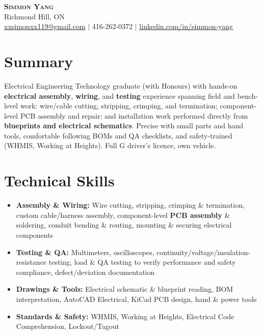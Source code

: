 \documentclass[letterpaper,11pt]{article}
\begin{document}
\begin{center}
    \textbf{\Huge \scshape Simmon Yang} \\ \vspace{1pt}
    Richmond Hill, ON \\
    \href{mailto:xxsimonxx119@gmail.com}{xxsimonxx119@gmail.com} $|$ 416-262-0372 $|$
    \href{https://www.linkedin.com/in/simmon-yang/}{linkedin.com/in/simmon-yang}
\end{center}

\section{Summary}
Electrical Engineering Technology graduate (with Honours) with hands-on \textbf{electrical assembly}, \textbf{wiring}, and \textbf{testing} experience spanning field and bench-level work: wire/cable cutting, stripping, crimping, and termination; component-level PCB assembly and repair; and installation work performed directly from \textbf{blueprints and electrical schematics}. Precise with small parts and hand tools, comfortable following BOMs and QA checklists, and safety-trained (WHMIS, Working at Heights). Full G driver's licence, own vehicle.

\section{Technical Skills}
\begin{itemize}[leftmargin=0.15in]
  \item \textbf{Assembly \& Wiring:} Wire cutting, stripping, crimping \& termination, custom cable/harness assembly, component-level \textbf{PCB assembly} \& soldering, conduit bending \& routing, mounting \& securing electrical components
  \item \textbf{Testing \& QA:} Multimeters, oscilloscopes, continuity/voltage/insulation-resistance testing, load \& QA testing to verify performance and safety compliance, defect/deviation documentation
  \item \textbf{Drawings \& Tools:} Electrical schematic \& blueprint reading, BOM interpretation, AutoCAD Electrical, KiCad PCB design, hand \& power tools
  \item \textbf{Standards \& Safety:} WHMIS, Working at Heights, Electrical Code Comprehension, Lockout/Tagout
\end{itemize}
\end{document}
